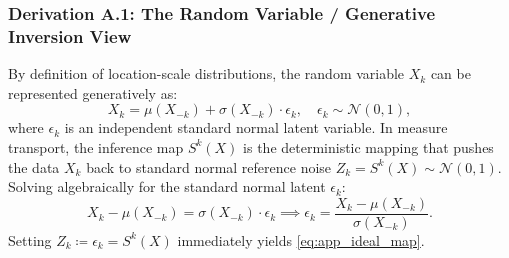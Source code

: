 \documentclass[11pt,a4paper]{article}
\theoremstyle{plain}
\theoremstyle{definition}
\theoremstyle{remark}
\begin{document}
\subsubsection{Derivation A.1: The Random Variable / Generative Inversion View}
By definition of location-scale distributions, the random variable $X_k$ can be represented generatively as:
\begin{equation}
    X_k = \mu(X_{-k}) + \sigma(X_{-k}) \cdot \epsilon_k, \quad \epsilon_k \sim \mathcal{N}(0, 1),
\end{equation}
where $\epsilon_k$ is an independent standard normal latent variable. In measure transport, the inference map $S^k(X)$ is the deterministic mapping that pushes the data $X_k$ back to standard normal reference noise $Z_k = S^k(X) \sim \mathcal{N}(0, 1)$. Solving algebraically for the standard normal latent $\epsilon_k$:
\begin{equation}
    X_k - \mu(X_{-k}) = \sigma(X_{-k}) \cdot \epsilon_k \implies \epsilon_k = \frac{X_k - \mu(X_{-k})}{\sigma(X_{-k})}.
\end{equation}
Setting $Z_k \coloneqq \epsilon_k = S^k(X)$ immediately yields \eqref{eq:app_ideal_map}.
\end{document}
